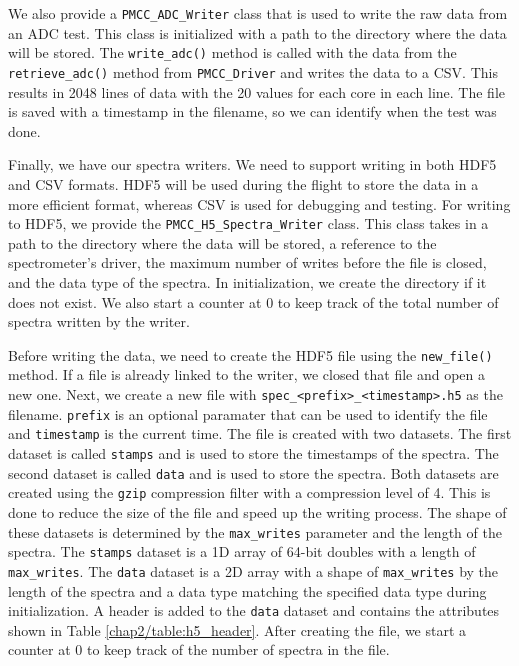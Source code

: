 We also provide a \texttt{PMCC\_ADC\_Writer} class that is used to write the raw data from an ADC test. 
This class is initialized with a path to the directory where the data will be stored.
The \texttt{write\_adc()} method is called with the data from the \texttt{retrieve\_adc()} method from \texttt{PMCC\_Driver} and writes the data to a CSV.
This results in 2048 lines of data with the 20 values for each core in each line.
The file is saved with a timestamp in the filename, so we can identify when the test was done. 

Finally, we have our spectra writers. 
We need to support writing in both HDF5 and CSV formats.
HDF5 will be used during the flight to store the data in a more efficient format, whereas CSV is used for debugging and testing.
For writing to HDF5, we provide the \texttt{PMCC\_H5\_Spectra\_Writer} class.
This class takes in a path to the directory where the data will be stored, a reference to the spectrometer's driver, the maximum number of writes before the file is closed, and the data type of the spectra. 
In initialization, we create the directory if it does not exist. 
We also start a counter at 0 to keep track of the total number of spectra written by the writer. 

Before writing the data, we need to create the HDF5 file using the \texttt{new\_file()} method.
If a file is already linked to the writer, we closed that file and open a new one.
Next, we create a new file with \texttt{spec\_<prefix>\_<timestamp>.h5} as the filename.
\texttt{prefix} is an optional paramater that can be used to identify the file and \texttt{timestamp} is the current time.
The file is created with two datasets. 
The first dataset is called \texttt{stamps} and is used to store the timestamps of the spectra.
The second dataset is called \texttt{data} and is used to store the spectra.
Both datasets are created using the \texttt{gzip} compression filter with a compression level of 4.
This is done to reduce the size of the file and speed up the writing process. 
The shape of these datasets is determined by the \texttt{max\_writes} parameter and the length of the spectra.
The \texttt{stamps} dataset is a 1D array of 64-bit doubles with a length of \texttt{max\_writes}.
The \texttt{data} dataset is a 2D array with a shape of \texttt{max\_writes} by the length of the spectra and a data type matching the specified data type during initialization.
A header is added to the \texttt{data} dataset and contains the attributes shown in Table \ref{chap2/table:h5_header}.
After creating the file, we start a counter at 0 to keep track of the number of spectra in the file. 

